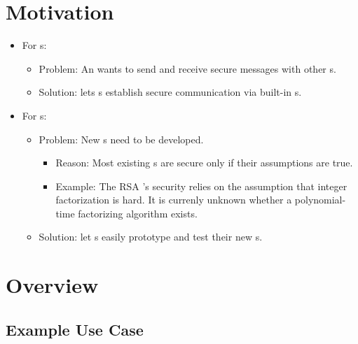 \documentclass[11pt]{extarticle}
\title{\deliv{\pp}{Report}}
\author{\names}
\date{2017-01-29}
\begin{document}
\maketitle
\tableofcontents
\thispagestyle{fancy}

\begin{flushleft}


\section{Motivation}

\begin{itemize}
\item For \eu s:
  \begin{itemize}
  \item Problem: An \eu{} wants to send and receive
    secure messages with other \eu s.
  \item Solution: \cry{} lets \eu s establish
    secure communication via built-in \cs s.
  \end{itemize}
\item For \cg s:
  \begin{itemize}
  \item Problem: New \cs s need to be developed.
    \begin{itemize}
    \item Reason: Most existing \cs s are secure
      only if their assumptions are true.
    \item Example: The RSA \cs's security relies on
      the assumption that integer factorization is hard.
      It is currenly unknown whether
      a polynomial-time factorizing algorithm exists.
    \end{itemize}
  \item Solution: \cry{} let \cg s easily prototype
    and test their new \cs s.
  \end{itemize}
\end{itemize}


\section{Overview}


\subsection{Example Use Case}


\end{flushleft}
\end{document}
